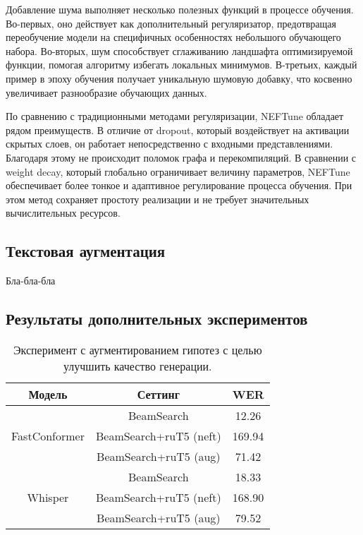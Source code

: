 Добавление шума выполняет несколько полезных функций в процессе обучения.
Во-первых, оно действует как дополнительный регуляризатор, предотвращая переобучение модели на специфичных особенностях небольшого обучающего набора.
Во-вторых, шум способствует сглаживанию ландшафта оптимизируемой функции, помогая алгоритму избегать локальных минимумов.
В-третьих, каждый пример в эпоху обучения получает уникальную шумовую добавку, что косвенно увеличивает разнообразие обучающих данных.

По сравнению с традиционными методами регуляризации, NEFTune обладает рядом преимуществ.
В отличие от dropout, который воздействует на активации скрытых слоев, он работает непосредственно с входными представлениями.
Благодаря этому не происходит поломок графа  и перекомпиляций.
В сравнении с weight decay, который глобально ограничивает величину параметров, NEFTune обеспечивает более тонкое и адаптивное регулирование процесса обучения.
При этом метод сохраняет простоту реализации и не требует значительных вычислительных ресурсов.

\subsection{Текстовая аугментация}
Бла-бла-бла

\subsection{Результаты дополнительных экспериментов}

\begin{table}[]
\centering
\caption{Эксперимент с аугментированием гипотез с целью улучшить качество генерации.}
\begin{tabular}{|c|c|c|}
\hline
Модель                         & Сеттинг                              & WER     \\ \hline
\multirow{3}{*}{FastConformer} & BeamSearch                           & 12.26   \\ \cline{2-3} 
                               & BeamSearch+ruT5 (neft)               & 169.94  \\ \cline{2-3} 
                               & BeamSearch+ruT5 (aug)                & 71.42   \\ \hline
\multirow{3}{*}{Whisper}       & BeamSearch                           & 18.33   \\ \cline{2-3} 
                               & BeamSearch+ruT5 (neft)               & 168.90  \\ \cline{2-3} 
                               & BeamSearch+ruT5 (aug)                & 79.52   \\ \hline
\end{tabular}
\label{tab:fails}
\end{table}

